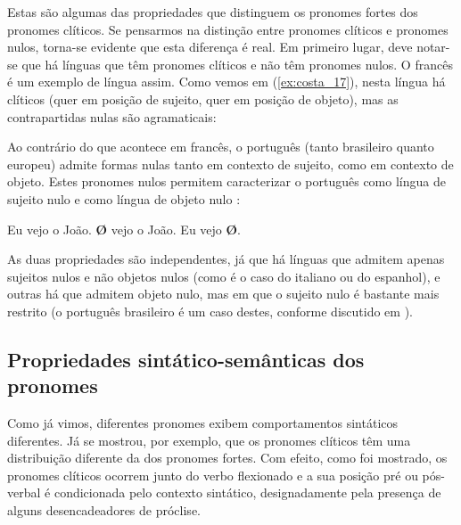\documentclass[output=paper]{LSP/langsci}
\begin{document}
Estas são algumas das propriedades que distinguem os pronomes fortes dos pronomes clíticos. Se pensarmos na distinção entre pronomes clíticos e pronomes nulos, torna-se evidente que esta diferença é real. Em primeiro lugar, deve notar-se que há línguas que têm pronomes clíticos e não têm pronomes nulos. O francês é um exemplo de língua assim. Como vemos em (\ref{ex:costa_17}), nesta língua há clíticos (quer em posição de sujeito, quer em posição de objeto), mas as contrapartidas nulas são agramaticais:

\ea\label{ex:costa_17}
\zl

Ao contrário do que acontece em francês, o português (tanto brasileiro quanto europeu) admite formas nulas tanto em contexto de sujeito, como em contexto de objeto. Estes pronomes nulos permitem caracterizar o português como língua de sujeito nulo e como língua de objeto nulo \citep{raposo1986}:

\ea\label{ex:costa_18}
\ea\label{ex:costa_18a} Eu vejo o João.
\ex\label{ex:costa_18b} \textbf{Ø} vejo o João.
\ex\label{ex:costa_18c} Eu vejo \textbf{Ø}.
\zl

As duas propriedades são independentes, já que há línguas que admitem apenas sujeitos nulos e não objetos nulos (como é o caso do italiano ou do espanhol),  e outras há que admitem objeto nulo, mas em que o sujeito nulo é bastante mais restrito (o português brasileiro é um caso destes, conforme discutido em \citealt{duarte1995}).

\subsection{Propriedades sintático-semânticas dos pronomes}
\label{subsec:costa_propriedades_sint_sem_pronomes}

Como já vimos, diferentes pronomes exibem comportamentos sintáticos diferentes. Já se mostrou, por exemplo, que os pronomes clíticos têm uma distribuição diferente da dos pronomes fortes. Com efeito, como foi mostrado, os pronomes clíticos ocorrem junto do verbo flexionado e a sua posição pré ou pós-verbal é condicionada pelo contexto sintático, designadamente pela presença de alguns desencadeadores de próclise.
\end{document}
